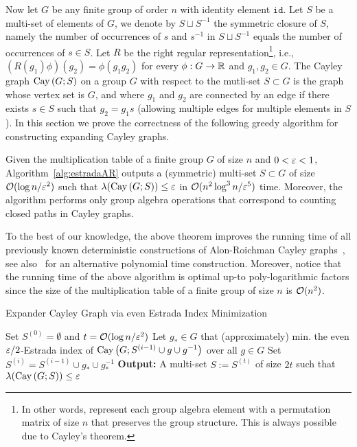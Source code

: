 %
Now let $G$ be any finite group of order $n$ with identity element $\mathtt{id}$. Let $S$ be a multi-set of elements of $G$, we denote by $S\sqcup S^{-1}$ the symmetric closure of $S$, namely the number of occurrences of $s$ and $s^{-1}$ in $S\sqcup S^{-1}$ equals the number of occurrences of $s\in S$. Let $R$ be the right regular representation\footnote{In other words, represent each group algebra element with a permutation matrix of size $n$ that preserves the group structure. This is always possible due to Cayley's theorem.}, i.e., $(R(g_1)\phi)(g_2) = \phi(g_1 g_2)$ for every $\phi : G \to \mathbb{R}$ and $g_1,g_2\in G$. The Cayley graph $\operatorname{Cay}\left(G; S\right)$ on a group $G$ with respect to the mutli-set $S\subset G$ is the graph whose vertex set is $G$, and where $g_1$ and $g_2$ are connected by an edge if there exists $s\in S$ such that $g_2 = g_1 s$ (allowing multiple edges for multiple elements in $S$). In this section we prove the correctness of the following greedy algorithm for constructing expanding Cayley graphs.
%
%
\begin{theorem}\label{thm:AR_graphs}
Given the multiplication table of a finite group $G$ of size $n$ and $0<\varepsilon<1$, Algorithm~\ref{alg:estradaAR} outputs a (symmetric) multi-set $S\subset G$ of size $\mathcal{O}(\log n /\varepsilon^2)$ such that $\lambda (\operatorname{Cay}\left(G; S\right)) \leq \varepsilon$ in $\mathcal{O}(n^2\log^3 n /\varepsilon^5)$ time. Moreover, the algorithm performs only group algebra operations that correspond to counting closed paths in Cayley graphs.
\end{theorem}
\begin{remark}
To the best of our knowledge, the above theorem improves the running time of all previously known deterministic constructions of Alon-Roichman Cayley graphs~\cite{arora:fast_SDP,chernoff:matrix_valued:derand:WX08,phdthesis:Kale:2008}, see also~\cite{cayley:latin12} for an alternative polynomial time construction. Moreover, notice that the running time of the above algorithm is optimal up-to poly-logarithmic factors since the size of the multiplication table of a finite group of size $n$ is $\mathcal{O}(n^2)$.
\end{remark}
\begin{algorithm}{}
	\caption{Expander Cayley Graph via even Estrada Index Minimization}\label{alg:estradaAR}
\begin{algorithmic}[1]
\State Set $S^{(0)}=\emptyset$ and $t=\mathcal{O}(\log n /\varepsilon^2)$
	\State Let $g_{*}\in G$ that (approximately) min. the even $\varepsilon/ 2$-Estrada index of $\operatorname{Cay}\left(G; S^{(i-1)}\cup g \cup g^{-1}\right)$ over all $g\in G $  
	\State Set $S^{(i)} = S^{(i-1)} \cup g_{*} \cup g_{*}^{-1}$
\EndFor
\State \textbf{Output:} A multi-set $S:=S^{(t)}$ of size $2t$ such that $\lambda(\operatorname{Cay}\left(G; S\right)) \leq \varepsilon$
\EndProcedure
\end{algorithmic}
\end{algorithm}
